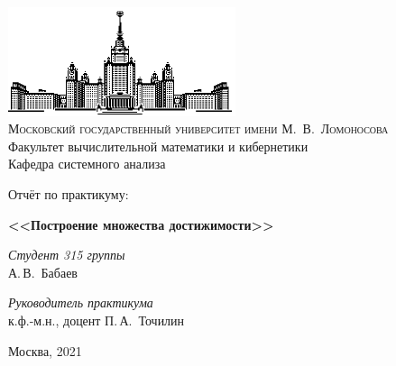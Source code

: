 \documentclass[11pt]{article}
\begin{document}
	
	\thispagestyle{empty}
	
	\begin{center}
		\ \vspace{-3cm}
		
		\includegraphics[width=0.5\textwidth]{msu.eps}\\
		{\scshape Московский государственный университет имени М.~В.~Ломоносова}\\
		Факультет вычислительной математики и кибернетики\\
		Кафедра системного анализа
		
		\vfill
		
		{\LARGE Отчёт по  практикуму:}
		
		\vspace{1cm}
		
		{\Huge\bfseries <<Построение множества достижимости>>}
	\end{center}
	
	\vspace{1cm}
	
	\begin{flushright}
		\large
		\textit{Студент 315 группы}\\
		А.\,В.~Бабаев
		
		\vspace{5mm}
		
		\textit{Руководитель практикума}\\
		к.ф.-м.н., доцент П.\,А.~Точилин
	\end{flushright}
	
	\vfill
	
	\begin{center}
		Москва, 2021
	\end{center}
	
\end{document}
